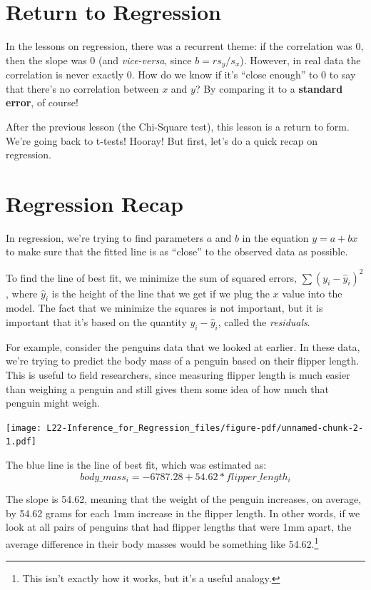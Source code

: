 \documentclass[
  letterpaper,
  DIV=11,
  numbers=noendperiod,
  oneside]{scrreprt}
\begin{document}
\hypertarget{return-to-regression}{%
\section{Return to Regression}\label{return-to-regression}}

In the lessons on regression, there was a recurrent theme: if the
correlation was 0, then the slope was 0 (and \emph{vice-versa}, since
\(b = rs_y/s_x\)). However, in real data the correlation is never
exactly 0. How do we know if it's ``close enough'' to 0 to say that
there's no correlation between \(x\) and \(y\)? By comparing it to a
\textbf{standard error}, of course!

After the previous lesson (the Chi-Square test), this lesson is a return
to form. We're going back to t-tests! Hooray! But first, let's do a
quick recap on regression.

\hypertarget{regression-recap}{%
\section{Regression Recap}\label{regression-recap}}

In regression, we're trying to find parameters \(a\) and \(b\) in the
equation \(y = a + bx\) to make sure that the fitted line is as
``close'' to the observed data as possible.

To find the line of best fit, we minimize the sum of squared errors,
\(\sum(y_i - \hat y_i)^2\), where \(\hat y_i\) is the height of the line
that we get if we plug the \(x\) value into the model. The fact that we
minimize the squares is not important, but it is important that it's
based on the quantity \(y_i - \hat y_i\), called the \emph{residuals}.

For example, consider the penguins data that we looked at earlier. In
these data, we're trying to predict the body mass of a penguin based on
their flipper length. This is useful to field researchers, since
measuring flipper length is much easier than weighing a penguin and
still gives them some idea of how much that penguin might weigh.

\texttt{[image: L22-Inference\_for\_Regression\_files/figure-pdf/unnamed-chunk-2-1.pdf]}

The blue line is the line of best fit, which was estimated as: \[
body\_mass_i = -6787.28 + 54.62*flipper\_length_i
\]

The slope is 54.62, meaning that the weight of the penguin increases, on
average, by 54.62 grams for each 1mm increase in the flipper length. In
other words, if we look at all pairs of penguins that had flipper
lengths that were 1mm apart, the average difference in their body masses
would be something like 54.62.\footnote{This isn't exactly how it works,
  but it's a useful analogy.}
\end{document}
